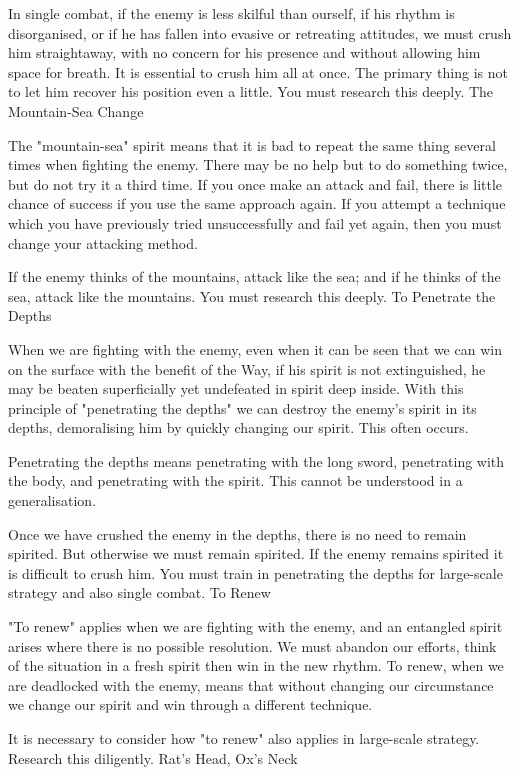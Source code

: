 In single combat, if the enemy is less skilful than ourself, if his rhythm is disorganised, or if he has fallen into evasive or retreating attitudes, we must crush him straightaway, with no concern for his presence and without allowing him space for breath. It is essential to crush him all at once. The primary thing is not to let him recover his position even a little. You must research this deeply.
The Mountain-Sea Change

The "mountain-sea" spirit means that it is bad to repeat the same thing several times when fighting the enemy. There may be no help but to do something twice, but do not try it a third time. If you once make an attack and fail, there is little chance of success if you use the same approach again. If you attempt a technique which you have previously tried unsuccessfully and fail yet again, then you must change your attacking method.

If the enemy thinks of the mountains, attack like the sea; and if he thinks of the sea, attack like the mountains. You must research this deeply.
To Penetrate the Depths

When we are fighting with the enemy, even when it can be seen that we can win on the surface with the benefit of the Way, if his spirit is not extinguished, he may be beaten superficially yet undefeated in spirit deep inside. With this principle of "penetrating the depths" we can destroy the enemy's spirit in its depths, demoralising him by quickly changing our spirit. This often occurs.

Penetrating the depths means penetrating with the long sword, penetrating with the body, and penetrating with the spirit. This cannot be understood in a generalisation.

Once we have crushed the enemy in the depths, there is no need to remain spirited. But otherwise we must remain spirited. If the enemy remains spirited it is difficult to crush him. You must train in penetrating the depths for large-scale strategy and also single combat.
To Renew

"To renew" applies when we are fighting with the enemy, and an entangled spirit arises where there is no possible resolution. We must abandon our efforts, think of the situation in a fresh spirit then win in the new rhythm. To renew, when we are deadlocked with the enemy, means that without changing our circumstance we change our spirit and win through a different technique.

It is necessary to consider how "to renew" also applies in large-scale strategy. Research this diligently.
Rat's Head, Ox's Neck

